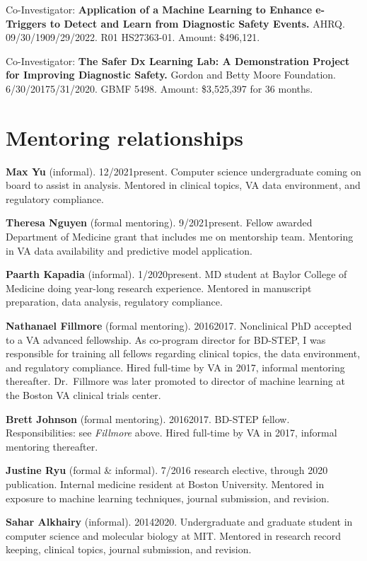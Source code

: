 \documentclass[10pt]{article}
\begin{document}
Co-Investigator: \textbf{Application of a Machine Learning to Enhance
  e-Triggers to Detect and Learn from Diagnostic Safety Events.} AHRQ.
09/30/19\ndash{}09/29/2022. R01 HS27363-01. Amount: \$496,121.

Co-Investigator: \textbf{The Safer Dx Learning Lab: A Demonstration
  Project for Improving Diagnostic Safety.} Gordon and Betty Moore
Foundation. 6/30/2017\ndash{}5/31/2020. GBMF 5498. Amount: \$3,525,397
for 36 months.




\section*{Mentoring relationships}

\textbf{Max Yu} (informal). 12/2021\ndash{}present. Computer science
undergraduate coming on board to assist in analysis. Mentored in
clinical topics, VA data environment, and regulatory compliance.

\textbf{Theresa Nguyen} (formal mentoring). 9/2021\ndash{}present.
Fellow awarded Department of Medicine grant that includes me on
mentorship team. Mentoring in VA data availability and predictive
model application.

\textbf{Paarth Kapadia} (informal). 1/2020\ndash{}present. MD student
at Baylor College of Medicine doing year-long research experience.
Mentored in manuscript preparation, data analysis, regulatory
compliance.

\textbf{Nathanael Fillmore} (formal mentoring). 2016\ndash{}2017.
Nonclinical PhD accepted to a VA advanced fellowship. As co-program
director for BD-STEP, I was responsible for training all fellows
regarding clinical topics, the data environment, and regulatory
compliance. Hired full-time by VA in 2017, informal mentoring
thereafter. Dr.\ Fillmore was later promoted to director of machine
learning at the Boston VA clinical trials center.

\textbf{Brett Johnson} (formal mentoring). 2016\ndash{}2017. BD-STEP
fellow. Responsibilities: see \emph{Fillmore} above. Hired full-time
by VA in 2017, informal mentoring thereafter.

\textbf{Justine Ryu} (formal \& informal). 7/2016 research elective,
through 2020 publication. Internal medicine resident at Boston
University. Mentored in exposure to machine learning techniques,
journal submission, and revision.

\textbf{Sahar Alkhairy} (informal). 2014\ndash{}2020. Undergraduate
and graduate student in computer science and molecular biology at MIT.
Mentored in research record keeping, clinical topics, journal
submission, and revision.
\end{document}
